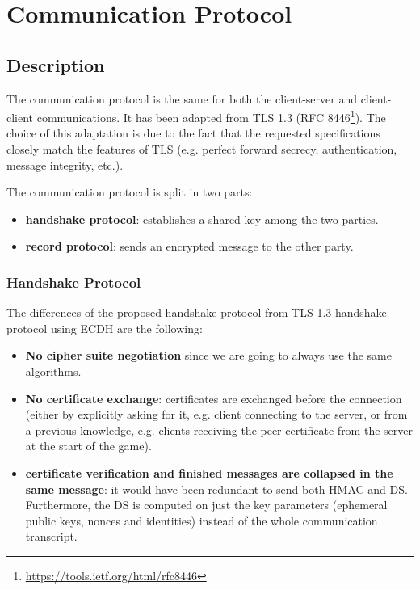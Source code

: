 \section{Communication Protocol}
\label{ref:protocol}

\subsection{Description}
The communication protocol is the same for both the client-server and client-client 
communications. 
It has been adapted from TLS 1.3 (RFC 8446\footnote{\url{https://tools.ietf.org/html/rfc8446}}).
The choice of this adaptation is due to the fact that the requested specifications 
closely match the features of TLS (e.g. perfect forward secrecy, authentication, 
message integrity, etc.).

The communication protocol is split in two parts:
\begin{itemize}
    \item \textbf{handshake protocol}: establishes a shared key among the two 
        parties.
    \item \textbf{record protocol}: sends an encrypted message to the other 
        party.
\end{itemize} 

\subsubsection{Handshake Protocol}
The differences of the proposed handshake protocol from TLS 1.3 handshake protocol
using ECDH are the following:
\begin{itemize}
    \item \textbf{No cipher suite negotiation} since we are going to always use 
        the same algorithms.
    \item \textbf{No certificate exchange}: certificates are exchanged before the 
        connection (either by explicitly asking for it, e.g. client connecting to
        the server, or from a previous knowledge, e.g. clients receiving the 
        peer certificate from the server at the start of the game).
    \item \textbf{certificate verification and finished messages are collapsed in the same 
        message}: it would have been redundant to send both HMAC and DS. 
        Furthermore, the DS is computed on just the key parameters (ephemeral 
        public keys, nonces and identities) instead of the whole communication
        transcript.
\end{itemize}


